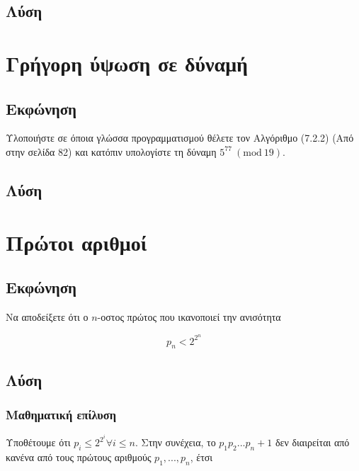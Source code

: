 \documentclass[oneside]{article}
\newcommand{\Mod}[1]{\ (\mathrm{mod}\ #1)}
\begin{document}
\subsection{Λύση}

\section{Γρήγορη ύψωση σε δύναμή}

\subsection{Εκφώνηση} 

Υλοποιήστε σε όποια γλώσσα προγραμματισμού θέλετε τον Αλγόριθμο (7.2.2) (Από \cite{draz} στην σελίδα 82) και κατόπιν υπολογίστε τη δύναμη $5^{77} \Mod{19}$.

\subsection{Λύση} 

\section{Πρώτοι αριθμοί}

\subsection{Εκφώνηση} 

Να αποδείξετε ότι ο $n$-οστος πρώτος που ικανοποιεί την ανισότητα 

\begin{equation}
    p_n < 2^{2^{n}}
\end{equation}

\subsection{Λύση} 

\subsubsection{Μαθηματική επίλυση}


Υποθέτουμε ότι $p_i \leq 2^{2^{i}}  \forall i \leq n$. Στην συνέχεια, το $p_1p_2...p_n + 1$ δεν διαιρείται από κανένα από τους πρώτους αριθμούς $p_1, ..., p_n$, έτσι
\end{document}
